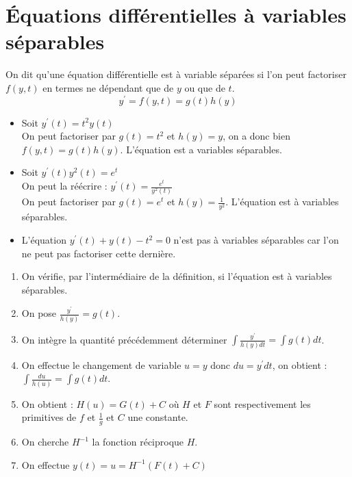 \section{Équations différentielles à variables séparables}
\begin{defi}
On dit qu'une équation différentielle est à variable séparées si l'on peut factoriser $f(y,t)$ en termes ne dépendant que de $y$ ou que de $t$.
$$y^{\prime}=f(y,t)=g(t)h(y)$$
\end{defi}
\begin{ex}
\begin{itemize}
    \item Soit $y^{\prime}(t)=t^2y(t)$ \\
    On peut factoriser par $g(t)=t^2$ et $h(y)=y$, on a donc bien $f(y,t)=g(t)h(y)$. L'équation est a variables séparables.
    \\
    \item Soit $y^{\prime}(t)y^2(t)=e^t$\\
    On peut la réécrire : $y^{\prime}(t)=\frac{e^t}{y^2(t)}$\\
    On peut factoriser par $g(t)=e^t$ et $h(y)=\frac{1}{y^2}$. L'équation est à variables séparables.\\
    \item L'équation $y^{\prime}(t)+y(t)-t^2=0$ n'est pas à variables séparables car l'on ne peut pas factoriser cette dernière.
\end{itemize}
\end{ex}
\begin{meth}
\begin{enumerate}
    \item On vérifie, par l'intermédiaire de la définition, si l'équation est à variables séparables.
    \item On pose $\frac{y^{\prime}}{h(y)}=g(t)$.
    \item On intègre la quantité précédemment déterminer $\int \frac{y^{\prime}}{h(y)dt}=\int g(t)dt$.
    \item On effectue le changement de variable $u=y$ donc $du=y^{\prime}dt$, on obtient :\\ $\int\frac{du}{h(u)}=\int g(t) dt$.
    \item On obtient : $H(u)=G(t)+C$ où $H$ et $F$ sont respectivement les primitives de $f$ et $\frac{1}{g}$ et $C$ une constante.
    \item On cherche $H^{-1}$ la fonction réciproque $H$.
    \item On effectue $y(t)=u=H^{-1}(F(t)+C)$
\end{enumerate}
\end{meth}
